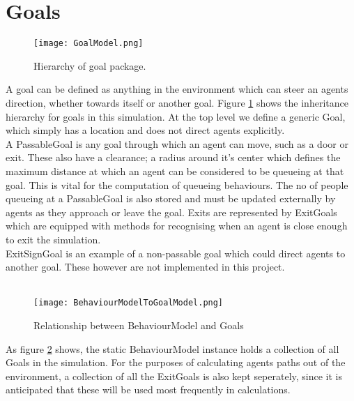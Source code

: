 \documentclass{article}
\begin{document}
\section{Goals}

\begin{figure}[here]
\centering
\texttt{[image: GoalModel.png]}
\caption{Hierarchy of goal package.}
\label{fig:goalhierarchy}
\end{figure}

A goal can be defined as anything in the environment which can steer an agents direction, whether towards itself or another goal. Figure \ref{fig:goalhierarchy} shows the inheritance hierarchy for goals in this simulation. At the top level we define a generic Goal, which simply has a location and does not direct agents explicitly.
\\
A PassableGoal is any goal through which an agent can move, such as a door or exit. These also have a clearance; a radius around it's center which defines the maximum distance at which an agent can be considered to be queueing at that goal. This is vital for the computation of queueing behaviours. The no of people queueing at a PassableGoal is also stored and must be updated externally by agents as they approach or leave the goal.
Exits are represented by ExitGoals which are equipped with methods for recognising when an agent is close enough to exit the simulation.
\\
ExitSignGoal is an example of a non-passable goal which could direct agents to another goal. These however are not implemented in this project.
\\
\\
\begin{figure}[here]
\centering
\texttt{[image: BehaviourModelToGoalModel.png]}
\caption{Relationship between BehaviourModel and Goals}
\label{fig:behaviourtogoalmodel}
\end{figure}

As figure \ref{fig:behaviourtogoalmodel} shows, the static BehaviourModel instance holds a collection of all Goals in the simulation. For the purposes of calculating agents paths out of the environment, a collection of all the ExitGoals is also kept seperately, since it is anticipated that these will be used most frequently in calculations.\\
\end{document}
